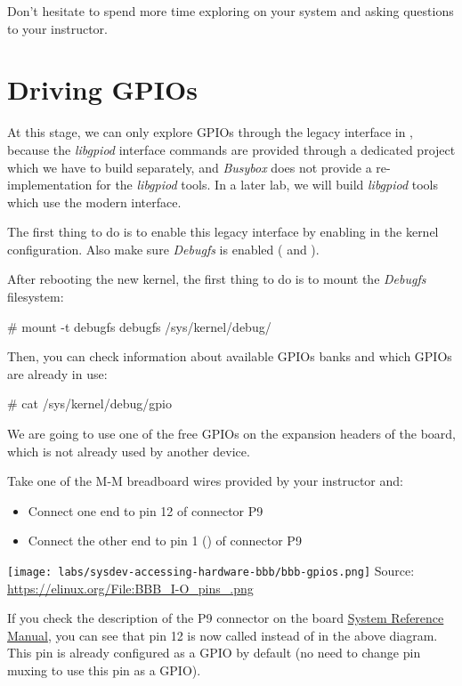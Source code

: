 Don't hesitate to spend more time exploring  on your system
and asking questions to your instructor.

\section{Driving GPIOs}

At this stage, we can only explore GPIOs through the legacy interface
in , because the {\em libgpiod} interface
commands are provided through a dedicated project which we have to
build separately, and {\em Busybox} does not provide a
re-implementation for the {\em libgpiod} tools. In a later lab, we
will build {\em libgpiod} tools which use the modern
 interface.

The first thing to do is to enable this legacy interface by enabling
 in the kernel configuration. Also make sure
{\em Debugfs} is enabled ( and
).

After rebooting the new kernel, the first thing to do is to mount
the {\em Debugfs} filesystem:

\begin{bashinput}
# mount -t debugfs debugfs /sys/kernel/debug/
\end{bashinput}

Then, you can check information about available GPIOs banks and which
GPIOs are already in use:

\begin{bashinput}
# cat /sys/kernel/debug/gpio
\end{bashinput}

We are going to use one of the free GPIOs on the expansion headers of the board,
which is not already used by another device.

Take one of the M-M breadboard wires provided by your instructor and:
\begin{itemize}
  \item Connect one end to pin 12 of connector P9
  \item Connect the other end to pin 1 () of connector P9
\end{itemize}

\texttt{[image: labs/sysdev-accessing-hardware-bbb/bbb-gpios.png]}
{\small Source: \url{https://elinux.org/File:BBB_I-O_pins_.png}}

If you check the description of the P9 connector on the board
\href{https://docs.beagleboard.org/boards/beaglebone/black/ch07.html\#connector-p9}{System Reference Manual},
you can see that pin 12 is now called 
instead of  in the above diagram.
This pin is already configured as a GPIO by default
(no need to change pin muxing to use this pin as a GPIO).

